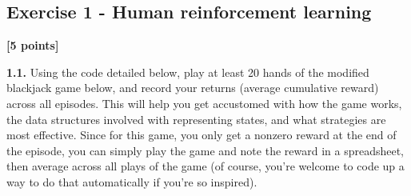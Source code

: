 \documentclass[
  letterpaper,
  DIV=11,
  numbers=noendperiod]{scrartcl}
\begin{document}
\subsection{Exercise 1 - Human reinforcement
learning}\label{exercise-1---human-reinforcement-learning}

\textbf{{[}5 points{]}}

\textbf{1.1.} Using the code detailed below, play at least 20 hands of
the modified blackjack game below, and record your returns (average
cumulative reward) across all episodes. This will help you get
accustomed with how the game works, the data structures involved with
representing states, and what strategies are most effective. Since for
this game, you only get a nonzero reward at the end of the episode, you
can simply play the game and note the reward in a spreadsheet, then
average across all plays of the game (of course, you're welcome to code
up a way to do that automatically if you're so inspired).
\end{document}

